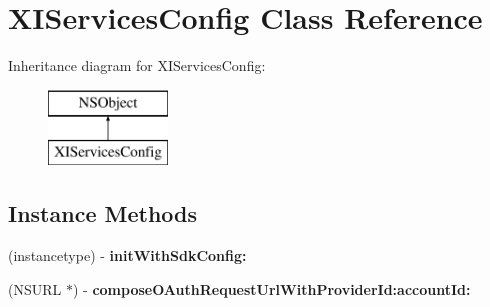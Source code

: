 \hypertarget{interface_x_i_services_config}{}\section{X\+I\+Services\+Config Class Reference}
\label{interface_x_i_services_config}
Inheritance diagram for X\+I\+Services\+Config\+:\begin{figure}[H]
\begin{center}
\leavevmode
\includegraphics[height=2.000000cm]{interface_x_i_services_config}
\end{center}
\end{figure}
\subsection*{Instance Methods}
\begin{DoxyCompactItemize}
\item 
\hypertarget{interface_x_i_services_config_a8bcf57220fec9686b591da5702e9f34c}{}\label{interface_x_i_services_config_a8bcf57220fec9686b591da5702e9f34c} 
(instancetype) -\/ {\bfseries init\+With\+Sdk\+Config\+:}
\item 
\hypertarget{interface_x_i_services_config_a794bc9a1215245faf1ad1df524d2cb2c}{}\label{interface_x_i_services_config_a794bc9a1215245faf1ad1df524d2cb2c} 
(N\+S\+U\+RL $\ast$) -\/ {\bfseries compose\+O\+Auth\+Request\+Url\+With\+Provider\+Id\+:account\+Id\+:}
\end{DoxyCompactItemize}

